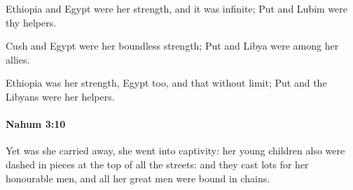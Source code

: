 			\begin{versebox}
					\item[BHS] 
					\item[LXX] 
					\item[ASV] Ethiopia and Egypt were her strength, and it was infinite; Put and Lubim were thy helpers.
					\item[NIV] Cush and Egypt were her boundless strength; Put and Libya were among her allies.
					\item[NRSV] Ethiopia was her strength, Egypt too, and that without limit; Put and the Libyans were her helpers.
			\end{versebox}

		\paragraph{Nahum 3:10} %
			\label{NAHUM-3-10}

			Yet was she carried away, she went into captivity: her young children also were dashed in pieces at the top of all the streets: and they cast lots for her honourable men, and all her great men were bound in chains.


